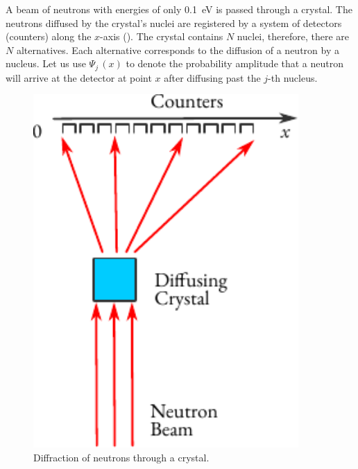  A beam of neutrons with energies of only \SI{0.1}{\eV} is passed through a crystal. The neutrons diffused by the crystal's nuclei are registered by a system of detectors (counters) along the $x$-axis (). The crystal contains $N$ nuclei, therefore, there are $N$ alternatives. Each alternative corresponds to the diffusion of a neutron by a nucleus. Let us use $ \Psi_{j} \, (x)$ to denote the probability amplitude that a neutron will arrive at the detector at point $x$ after diffusing past the $j$-th nucleus.
\begin{figure}%
\centering
\includegraphics[width=0.9\textwidth]{figures/neutron-diff.pdf}
\caption{Diffraction of neutrons through a crystal.\label{neutron-diff}}
\end{figure}

